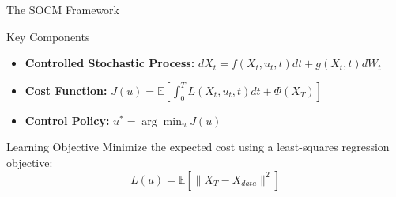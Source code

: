 \documentclass[aspectratio=169,xcolor=dvipsnames]{beamer}
\begin{document}
\begin{frame}{The SOCM Framework}
    \begin{block}{Key Components}
        \begin{itemize}
            \item \textbf{Controlled Stochastic Process:} $dX_t = f(X_t, u_t, t) dt + g(X_t, t) dW_t$
            \item \textbf{Cost Function:} $J(u) = \mathbb{E}\left[\int_0^T L(X_t, u_t, t) dt + \Phi(X_T)\right]$
            \item \textbf{Control Policy:} $u^* = \arg\min_u J(u)$
        \end{itemize}
    \end{block}
    
    \vspace{0.3cm}
    
    \begin{block}{Learning Objective}
        Minimize the expected cost using a least-squares regression objective:
        \begin{equation}
        L(u) = \mathbb{E}\left[\|X_T - X_{data}\|^2\right]
        \end{equation}
    \end{block}
\end{frame}
\end{document}
